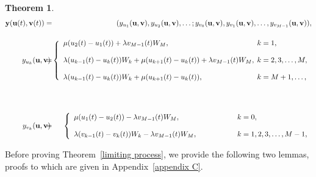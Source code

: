 \documentclass[12pt]{article}
\newtheorem{theorem}{Theorem}[section]
\newcommand{\blue}[1]{\textcolor{blue}{#1}}
\begin{document}
\begin{theorem}
\begin{eqnarray}
 \textbf{y}(\textbf{u}(t),\textbf{v}(t))&=& (y_{u_{1}} (\textbf{u},\textbf{v}),y_{u_{2}} (\textbf{u},\textbf{v}),\ldots;y_{v_{0}} (\textbf{u},\textbf{v}),y_{v_{1}} (\textbf{u},\textbf{v}),\ldots,y_{v_{M-1}} (\textbf{u},\textbf{v})), \\[4mm]
 \nonumber y_{u_{k}} (\textbf{u},\textbf{v})\hspace{-3mm} &=&\hspace{-3mm}\left\{\begin{array}{ll}
                                                \mu(u_{2}(t)-u_{1}(t))+\lambda v_{M-1}(t)W_{M}, &\hspace{-2mm}k=1,\\[4mm]
                                                \lambda (u_{k-1}(t)-u_{k}(t))W_{k}+\mu(u_{k+1}(t)-u_{k}(t))+\lambda v_{M-1}(t)W_{M},&\hspace{-2mm}k=2,3,\ldots,M, \\[4mm]
                                                \lambda (u_{k-1}(t)-u_{k}(t))W_{k}+\mu(u_{k+1}(t)-u_{k}(t)),&\hspace{-2mm} k=M+1,\ldots,
                                              \end{array}
                                              \right.\\[4mm]
                                              \\[4mm]
  y_{v_{k}} (\textbf{u},\textbf{v}) \hspace{-3mm}&=& \hspace{-3mm}\left\{\begin{array}{ll}
                                                 \mu(u_{1}(t)-u_{2}(t))-\lambda v_{M-1}(t)W_{M}, & ~~~~~~~~~~~~~~k=0, \\[4mm]
                                                 \lambda (v_{k-1}(t)-v_{k}(t))W_{k}-\lambda v_{M-1}(t)W_{M}, &~~~~~~~~~~~~~~ k=1,2,3,\ldots,M-1,
                                               \end{array}
                                        \right.
\end{eqnarray}
\end{theorem}

Before proving Theorem~\ref{limiting process}, we provide the following two lemmas, proofs to which are given in Appendix~\ref{appendix C}.
\end{document}
